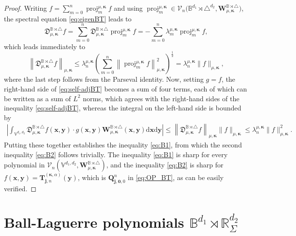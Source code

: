 \documentclass{amsart}
\theoremstyle{remark}
\def\d{\mathrm{d}}
\def\fD{{\mathfrak D}}
\def\a{{\alpha}}
\def\l{{\lambda}}
\def\CV{{\mathcal V}}
\def\BB{{\mathbb B}}
\def\RR{{\mathbb R}}
\def\VV{{\mathbb V}}
\def\proj{\operatorname{proj}}
\def\bk{{\boldsymbol{\kappa}}}
\def\f{\frac}
\begin{document}
\begin{proof}
Writing $f = \sum_{m=0}^n \proj_m^{\mu,\bk} f$ and using $\proj_m^{\mu,\bk} \in
 \CV_n\big(\BB^{d_1}\! \!\rtimes\!\triangle^{d_2}, \bm W_{\mu, \bk}^{\BB\rtimes \triangle}\big)$,
the spectral equation \eqref{eq:eigenBT} leads to 
$$
 \fD_{\mu, \bk}^{\BB\rtimes \triangle} f =  \sum_{m=0}^n \fD_{\mu, \bk}^{\BB\rtimes \triangle} \proj_m^{\mu,\bk}f
     =  - \sum_{m=0}^n \l_m^{\mu,\bk} \proj_m^{\mu,\bk}f, 
$$
which leads immediately to 
$$
  \left \| \fD_{\mu, \bk}^{\BB\rtimes \triangle} f  \right \|_{\mu,\bk} \le
    \l_n^{\mu,\bk} \left( \sum_{m=0}^n   \left \| \proj_m^{\mu,\bk} f \right\|_{\mu,\bk}^2
  \right)^{\f12} 
     = \l_n^{\mu,\bk} \|f\|_{\mu,\bk},
$$
where the last step follows from the Parseval identity. Now, setting $g = f$, the right-hand side of \eqref{eq:self-adjBT} becomes 
a sum of four terms, each of which can be written as a sum of $L^2$ norms, which agrees with the right-hand sides of the
inequality \eqref{eq:self-adjBT}, whereas the integral on the left-hand side is bounded by
\begin{align*}
  \left |  \int_{\VV^{d_1,d_2}}\fD_{\mu, \bk}^{\BB\rtimes \triangle} f (\bm x,\bm y) \cdot g(\bm x, \bm y)
   \bm W_{\mu, \bk}^{\BB\rtimes \triangle}(\bm x, \bm y) \d \bm x \d \bm y 
      \right| 
    \le  \left \| \fD_{\mu, \bk}^{\BB\rtimes \triangle} f \right\|_{\mu,\bk} \|f\|_{\mu,\bk} 
    \le \l_n^{\mu,\bk} \|f\|_{\mu,\bk}^2.
\end{align*}
Putting these together establishes the inequality \eqref{eq:B1}, from which the second inequality \eqref{eq:B2} follows trivially. 
The inequality \eqref{eq:B1} is sharp for every polynomial in
 $\CV_n(\VV^{d_1,d_2}, \bm W_{\mu, \bk}^{\BB\rtimes \triangle})$, and the inequality 
\eqref{eq:B2} is sharp for $f(\bm x, \bm y) = \bm T_{\bm j, n}^{(\bk, \a)}(\bm y)$, which is $\bm Q_{\bm j, \bm 0, 0}^n$ in 
\eqref{eq:OP_BT}, as can be easily verified. 
\end{proof}


\section{Ball-Laguerre polynomials $\BB^{d_1} \rtimes \RR_\Sigma^{d_2}$}
\setcounter{equation}{0}
\end{document}
